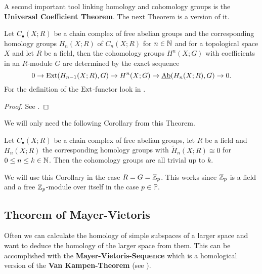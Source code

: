 A second important tool linking homology and cohomology groups is the \textbf{Universal Coefficient Theorem}. The next Theorem is a version of it.

\begin{thm}\label{thm:uct}
Let $C_\bullet(X; R)$ be a chain complex of free abelian groups and the corresponding homology groups $H_n(X; R)$ of $C_n(X; R)$ for $n \in \mathbb{N}$ and for a topological space $X$ and let $R$ be a field, then the cohomology groups $H^n(X; G)$ with coefficients in an $R$-module $G$ are determined by the exact sequence
  \begin{equation*}
    0 \to {\rm Ext}(H_{n-1}(X; R), G) \to H^n(X; G) \to \underline{\rm Ab}(H_n(X; R), G) \to 0.
  \end{equation*}
  For the definition of the ${\rm Ext}$-functor look in \cite[p. 195]{hatcher}.
\end{thm}

\begin{proof}
  See \cite[Chapter 3.1]{hatcher}.
\end{proof}

We will only need the following Corollary from this Theorem.

\begin{col}\label{col:hntriv}
  Let $C_\bullet(X; R)$ be a chain complex of free abelian groups, let $R$ be a field and $H_n(X; R)$ the corresponding homology groups with $\tilde{H}_n(X; R) \cong 0$ for $0 \leq n \leq k \in \mathbb{N}$. Then the cohomology groups are all trivial up to $k$. 
\end{col}

We will use this Corollary in the case $R = G = \mathbb{Z}_p$. This works since $\mathbb{Z}_p$ is a field and a free $\mathbb{Z}_p$-module over itself in the case $p \in \mathbb{P}$.

\subsection{Theorem of Mayer-Vietoris}
Often we can calculate the homology of simple subspaces of a larger space and want to deduce the homology of the larger space from them.
This can be accomplished with the \textbf{Mayer-Vietoris-Sequence} which is a homological version of the \textbf{Van Kampen-Theorem} (see \cite[Chapter 1.2]{hatcher}).

